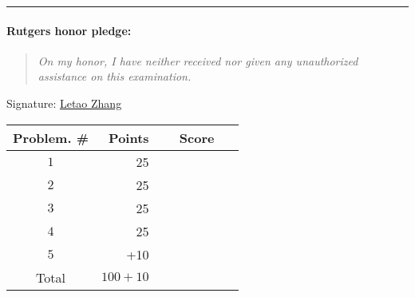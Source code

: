 \documentclass{article}
\theoremstyle{definition}
\def\fline{\rule{0.75\linewidth}{0.5pt}}
\newcommand{\finishline}{\vspace{-15pt}\begin{center}\fline\end{center}}
\begin{document}
\finishline

\paragraph{Rutgers honor pledge:} 

\begin{quote}
\emph{On my honor, I have neither received nor given any unauthorized assistance on this
examination.} 
\end{quote}
\hfill{Signature: \underline{Letao Zhang}}

\bigskip

\begin{center}
\begin{tabular}{|c|r|c|}
\hline
Problem. \# & Points & Score \\ \hline\hline
$1$ & 25 & ~~~~~~~~~~~\\  \hline
$2$ & 25 & \\ \hline
$3$ & 25 & \\ \hline
$4$ & 25 & \\ \hline
$5$ & +10 & \\ \hline
Total & $100 + 10$ & \\ \hline
\end{tabular}
\end{center}

\newpage
\end{document}
